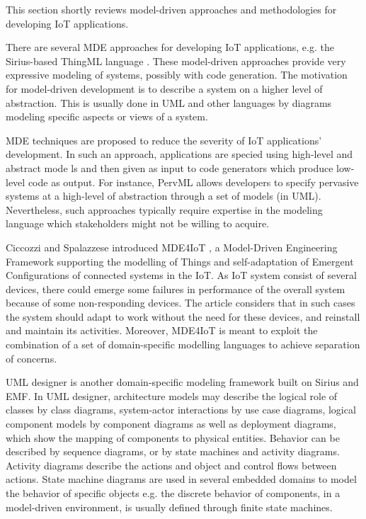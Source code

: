 
This section shortly reviews model-driven approaches and methodologies for developing IoT applications.

There are several MDE approaches for developing IoT applications, e.g. the Sirius-based ThingML language \cite{Fleurey+2011}. These model-driven approaches provide very expressive modeling of systems, possibly with code generation. The motivation for model-driven development is to describe a system on a higher level of abstraction. This is usually done in UML and other languages by diagrams modeling specific aspects or views of a system.

MDE techniques are proposed to reduce the severity of IoT applications' development. In such an approach, applications are specied using high-level and abstract mode ls and then given as input to code generators which produce low-level code as output. For instance, PervML \cite{serral2010towards} allows developers to specify pervasive systems at a high-level of abstraction through a set of models (in UML). Nevertheless, such approaches typically require expertise in the modeling language which stakeholders might not be willing to acquire.

Ciccozzi and Spalazzese introduced MDE4IoT \cite{ciccozzi2016mde4iot}, a Model-Driven Engineering Framework supporting the modelling of Things and self-adaptation of Emergent Configurations of connected systems in the IoT. As IoT system consist of several devices, there could emerge some failures in performance of the overall system because of some non-responding devices. The article considers that in such cases the system should adapt to work without the need for these devices, and reinstall and maintain its activities. Moreover, MDE4IoT is meant to exploit the combination of a set of domain-specific modelling languages to achieve separation of concerns.

UML designer \cite{umlDesigner} is another domain-specific modeling framework built on Sirius and EMF. In UML designer, architecture models may describe the logical role of classes by class diagrams, system-actor interactions by use case diagrams, logical component models by component diagrams as well as deployment diagrams, which show the mapping of components to physical entities. Behavior can be described by sequence diagrams, or by state machines and activity diagrams. Activity diagrams describe the actions and object and control flows between actions. State machine diagrams are used in several embedded domains to model the behavior of specific objects e.g. the discrete behavior of components, in a model-driven environment, is usually defined through finite state machines. 

